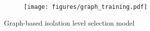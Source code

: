 \begin{figure}[t]
    \centering
    \begin{minipage}{0.99\linewidth}
        \centering
        \begin{subfigure}{1.0\linewidth}
            \texttt{[image: figures/graph\_training.pdf]}
        \end{subfigure}
    \end{minipage}
    \vspace{-4mm}
    \caption{Graph-based isolation level selection model}
    \label{fig:graph_learning}
    \vspace{-4mm}
\end{figure}



